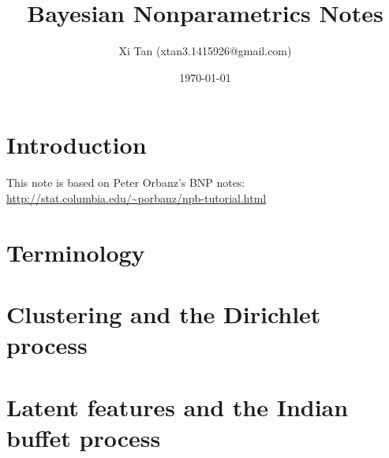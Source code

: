 \documentclass{article}
\title{Bayesian Nonparametrics Notes}
\author{Xi Tan (xtan3.1415926@gmail.com)}
\date{\today}
\begin{document}
\maketitle
\tableofcontents


\section{Introduction}
This note is based on Peter Orbanz's BNP notes:
\vspace*{5mm}
\\
\url{http://stat.columbia.edu/~porbanz/npb-tutorial.html}

\section{Terminology}

\section{Clustering and the Dirichlet process}

\section{Latent features and the Indian buffet process}
\end{document}
